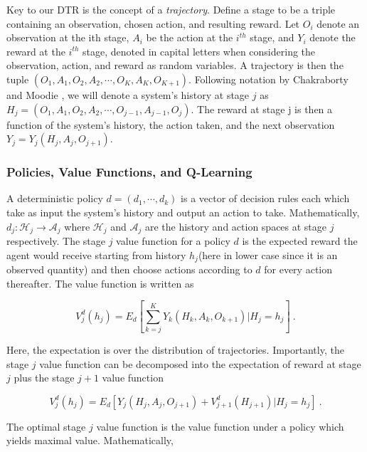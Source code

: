 Key to our DTR is the concept of a \textit{trajectory}. Define a stage to be a triple containing an observation, chosen action, and resulting reward. Let $O_i$ denote an observation at the ith stage, $ A_i $ be the action at the $ i^{th} $ stage, and $ Y_i $ denote the reward at the $ i^{th}$ stage, denoted in capital letters when considering the observation, action, and reward as random variables.  A  trajectory is then the tuple $ (O_1, A_1, O_2, A_2,  \cdots, O_K, A_K, O_{K+1})$.  Following notation by Chakraborty and Moodie \cite{chakraborty2013statistical}, we will denote a system’s history at stage $ j $ as $ H_j = (O_1, A_1, O_2, A_2, \cdots , O_{j-1}, A_{j-1}, O_j) $.  The reward at stage j is then a function of the system’s history, the action taken, and the next observation $ Y_j = Y_j(H_j, A_j, O_{j+1}) $.

\subsubsection{Policies, Value Functions, and Q-Learning}

A deterministic policy $ d = (d_1, \cdots, d_k) $ is a vector of decision rules each which take as input the system’s history and output an action to take.  Mathematically, $d_j : \mathcal{H}_j \to \mathcal{A}_j$ where $\mathcal{H}_j$ and $\mathcal{A}_j$ are the history and action spaces at stage $j$ respectively.  The stage $ j $ value function for a policy $ d $ is the expected reward the agent would receive starting from history $ h_j  $(here in lower case since it is an observed quantity) and then choose actions according to $ d $ for every action thereafter.  The value function is written as

\begin{equation}
	V^d_j(h_j) = E_d\left[ \sum_{k=j}^K Y_k(H_k, A_k, O_{k+1}) \Bigg\lvert H_j = h_j\right] \>.
\end{equation}

\noindent Here, the expectation is over the distribution of trajectories. Importantly, the stage $ j $ 
value function can be decomposed into the expectation of reward at stage $ j $ plus the stage $ j+1  $ value function  \cite{chakraborty2013statistical}

\begin{equation}
V^d_j(h_j) = E_d\left[Y_j(H_j, A_j, O_{j+1}) + V^d_{j+1}(H_{j+1}) \vert H_j = h_j\right] \>.
\end{equation}


\noindent The optimal stage $ j  $ value function is the value function under a policy which yields maximal value.  Mathematically, 

